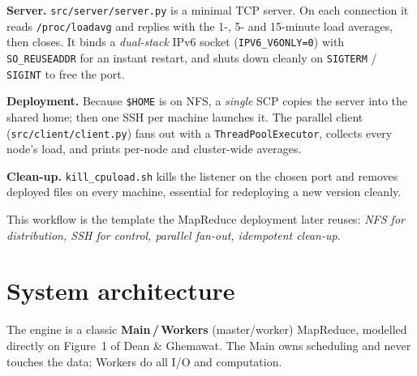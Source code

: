 \documentclass[11pt,a4paper]{article}
\newcommand{\code}[1]{\texttt{\small #1}}
\begin{document}
\textbf{Server.} \code{src/server/server.py} is a minimal TCP server. On
each connection it reads \code{/proc/loadavg} and replies with the 1-, 5- and
15-minute load averages, then closes. It binds a \emph{dual-stack} IPv6 socket
(\code{IPV6\_V6ONLY=0}) with \code{SO\_REUSEADDR} for an instant restart,
and shuts down cleanly on \code{SIGTERM} / \code{SIGINT} to free the port.

\textbf{Deployment.} Because \code{\$HOME} is on NFS, a \emph{single} SCP copies
the server into the shared home; then one SSH per machine launches it. The
parallel client (\code{src/client/client.py}) fans out with a
\code{ThreadPoolExecutor}, collects every node's load, and prints per-node and
cluster-wide averages.

\textbf{Clean-up.} \code{kill\_cpuload.sh} kills the listener on the chosen port
and removes deployed files on every machine, essential for redeploying a new
version cleanly.

This workflow is the template the MapReduce deployment later reuses:
\emph{NFS for distribution, SSH for control, parallel fan-out, idempotent
clean-up}.

\section{System architecture}\label{sec:arch}

The engine is a classic \textbf{Main\,/\,Workers} (master/worker) MapReduce,
modelled directly on Figure~1 of Dean \& Ghemawat. The Main owns scheduling and
never touches the data; Workers do all I/O and computation.
\end{document}
